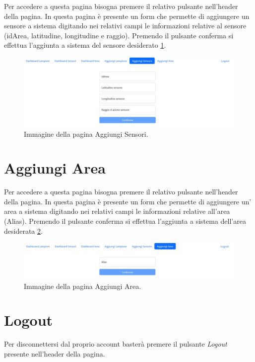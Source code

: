 Per accedere a questa pagina bisogna premere il relativo pulsante nell'header della pagina. In questa pagina è presente un form che permette di aggiungere un sensore a sistema digitando nei relativi campi le informazioni relative al sensore (idArea, latitudine, longitudine e raggio). Premendo il pulsante conferma si effettua l'aggiunta a sistema del sensore desiderato \ref{fig:aggiunta_sens}.

\begin{figure}[ht]
    \centering
    \includegraphics[width=\textwidth]{img/aggiunta_sens.jpeg}
    \caption{Immagine della pagina Aggiungi Sensori.}
    \label{fig:aggiunta_sens}
\end{figure}

\section{Aggiungi Area}

Per accedere a questa pagina bisogna premere il relativo pulsante nell'header della pagina. In questa pagina è presente un form che permette di aggiungere un' area a sistema digitando nei relativi campi le informazioni relative all'area (Alias). Premendo il pulsante conferma si effettua l'aggiunta a sistema dell'area desiderata \ref{fig:aggiunta_area}.

\begin{figure}[ht]
    \centering
    \includegraphics[width=\textwidth]{img/aggiunta_area.jpeg}
    \caption{Immagine della pagina Aggiungi Area.}
    \label{fig:aggiunta_area}
\end{figure}

\section{Logout}

Per disconnettersi dal proprio account basterà premere il pulsante \textit{Logout} presente nell'header della pagina.